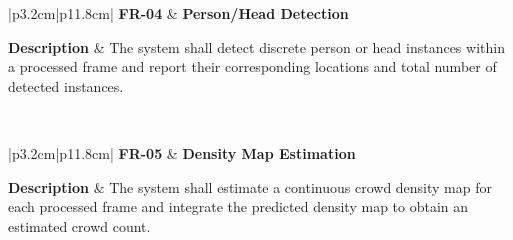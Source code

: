 \begin{table}[H]
	\centering
	\renewcommand{\arraystretch}{1.25}
	\begin{tabular}{|p{3.2cm}|p{11.8cm}|}
		\hline
		\textbf{FR-04} &
		\textbf{Person/Head Detection} \\ \hline
		
		\textbf{Description} &
		The system shall detect discrete person or head instances within a processed frame and report their corresponding locations and total number of detected instances. \\ \hline
		
		 \\ \hline
	\end{tabular}
	\caption{Functional requirement for person or head detection.}
	\label{tab:fr04}
\end{table}


\begin{table}[H]
	\centering
	\renewcommand{\arraystretch}{1.25}
	\begin{tabular}{|p{3.2cm}|p{11.8cm}|}
		\hline
		\textbf{FR-05} &
		\textbf{Density Map Estimation} \\ \hline
		
		\textbf{Description} &
		The system shall estimate a continuous crowd density map for each processed frame and integrate the predicted density map to obtain an estimated crowd count. \\ \hline
		
		 \\ \hline
	\end{tabular}
	\caption{Functional requirement for density map estimation.}
	\label{tab:fr05}
\end{table}


